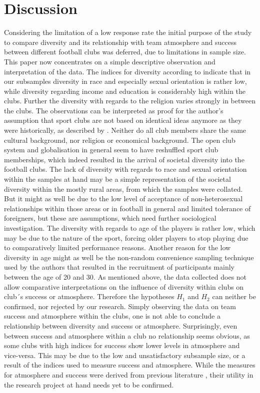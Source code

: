 \documentclass[	
	12pt, %
	a4paper, %
]{scrartcl}\usepackage[]{graphicx}\usepackage[]{color}
\begin{document}
\section{Discussion}
\label{sec:discussion}
Considering the limitation of a low response rate the initial purpose of the study to compare diversity and its relationship with team atmosphere and success between different football clubs was deferred, due to limitations in sample size. This paper now concentrates on a simple descriptive observation and interpretation of the data.
The indices for diversity according to  indicate that in our subsamples diversity in race and especially sexual orientation is rather low, while diversity regarding income and education is considerably high within the clubs. Further the diversity with regards to the religion varies strongly in between the clubs. The observations can be interpreted as proof for the author’s assumption that sport clubs are not based on identical ideas anymore as they were historically, as described by . Neither do all club members share the same cultural background, nor religion or economical background. The open club system and globalisation in general seem to have reshuffled sport club memberships, which indeed resulted in the arrival of societal diversity into the football clubs. The lack of diversity with regards to race and sexual orientation within the samples at hand may be a simple representation of the societal diversity within the mostly rural areas, from which the samples were collated. But it might as well be due to the low level of acceptance of non-heterosexual relationships within those areas or in football in general and limited tolerance of foreigners, but these are assumptions, which need further sociological investigation. 
The diversity with regards to age of the players is rather low, which may be due to the nature of the sport, forcing older players to stop playing due to comparatively limited performance reasons. Another reason for the low diversity in age might as well be the non-random convenience sampling technique used by the authors that resulted in the recruitment of participants mainly between the age of 20 and 30.
As mentioned above, the data collected does not allow comparative interpretations on the influence of diversity within clubs on club´s success or atmosphere. Therefore the hypotheses $H_{1}$ and $H_{2}$ can neither be confirmed, nor rejected by our research. 
Simply observing the data on team success and atmosphere within the clubs, one is not able to conclude a relationship between diversity and success or atmosphere. Surprisingly, even between success and atmosphere within a club no relationship seems obvious, as some clubs with high indices for success show lower levels in atmosphere and vice-versa. This may be due to the low and unsatisfactory subsample size, or a result of the indices used to measure success and atmosphere. While the measures for atmosphere and success were derived from previous literature \cite{Basadur2001, Timmerman2000}, their utility in the research project at hand needs yet to be confirmed.
\end{document}
